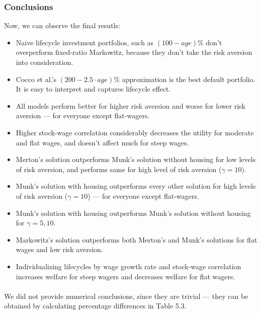 \documentclass[]{elsarticle}
\begin{document}
\resetgeometry

\subsubsection{Conclusions}
Now, we can observe the final resutls:

\begin{itemize}

\item Naive lifecycle investment portfolios, such as $(100-age)\%$ don't overperform fixed-ratio Markowitz, because they don't take the risk aversion into consideration.
\item Cocco et al.'s $(200-2.5\cdot age)\%$ approximation is the best default portfolio. It is easy to interpret and captures lifecycle effect.
\item All models perform better for higher risk aversion and worse for lower risk aversion --- for everyone except flat-wagers.
\item Higher stock-wage correlation considerably decreases the utility for moderate and flat wages, and doesn't affect much for steep wages.
\item Merton's solution outperforms Munk's solution without housing for low levels of risk aversion, and performs same for high level of risk aversion ($\gamma=10$).
\item Munk's solution with housing outperforms every other solution for high levels of risk aversion ($\gamma=10$) --- for everyone except flat-wagers.
\item Munk's solution with housing outperforms Munk's solution without housing for $\gamma=5,10$.
\item Markowitz's solution outperforms both Merton's and Munk's solutions for flat wages and low risk aversion.
\item Individualizing lifecycles by wage growth rate and stock-wage correlation increases welfare for steep wagers and decreases welfare for flat wagers.
\end{itemize}

\paragraph{}We did not provide numerical conclusions, since they are trivial --- they can be obtained by calculating percentage differences in Table 5.3.
\end{document}
